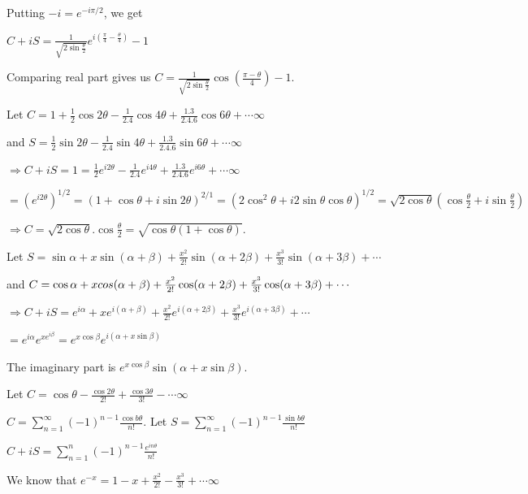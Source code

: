  Putting $-i = e^{-i\pi/2}$, we get

  $C + iS = \frac{1}{\sqrt{2\sin\frac{\theta}{2}}}e^{i\left(\frac{\pi}{4} - \frac{\theta}{4}\right)} - 1$

  Comparing real part gives us $C = \frac{1}{\sqrt{2\sin\frac{\theta}{2}}}\cos\left(\frac{\pi -
    \theta}{4}\right) - 1$.
\item Let $C = 1 + \frac{1}{2}\cos2\theta - \frac{1}{2.4}\cos4\theta + \frac{1.3}{2.4.6}\cos6\theta +
  \cdots \infty$

  and $S = \frac{1}{2}\sin2\theta - \frac{1}{2.4}\sin4\theta + \frac{1.3}{2.4.6}\sin6\theta +
  \cdots \infty$

  $\Rightarrow C + iS = 1 = \frac{1}{2}e^{i2\theta} - \frac{1}{2.4}e^{i4\theta} +
  \frac{1.3}{2.4.6}e^{i6\theta} + \cdots \infty$

  $= \left(e^{i2\theta}\right)^{1/2} = (1 + \cos\theta + i\sin2\theta)^{2/1} = \left(2\cos^2\theta +
  i2\sin\theta\cos\theta\right)^{1/2} = \sqrt{2\cos\theta}\left(\cos\frac{\theta}{2} +
  i\sin\frac{\theta}{2}\right)$

  $\Rightarrow C = \sqrt{2\cos\theta}.\cos\frac{\theta}{2} = \sqrt{\cos\theta(1 + \cos\theta)}$.
\item Let $S = \sin\alpha + x\sin(\alpha + \beta) + \frac{x^2}{2!}\sin(\alpha + 2\beta) +
  \frac{x^3}{3!}\sin(\alpha + 3\beta) + \cdots$

  and $C = \cos\alpha + x\\cos(\alpha + \beta) + \frac{x^2}{2!}\cos(\alpha + 2\beta) +
  \frac{x^3}{3!}\cos(\alpha + 3\beta) + \cdots$

  $\Rightarrow C + iS = e^{i\alpha} + xe^{i(\alpha + \beta)} + \frac{x^2}{2!}e^{i(\alpha + 2\beta)} +
  \frac{x^3}{3!}e^{i(\alpha + 3\beta)} + \cdots$

  $= e^{i\alpha}e^{xe}^{i\beta} = e^{x\cos\beta}e^{i(\alpha + x\sin\beta)}$

  The imaginary part is $e^{x\cos\beta}\sin(\alpha + x\sin\beta)$.
\item Let $C = \cos\theta - \frac{\cos2\theta}{2!} + \frac{\cos3\theta}{3!} - \cdots
  \infty$

  $C = \displaystyle\sum_{n = 1}^\infty(-1)^{n - 1}\frac{\cos b\theta}{n!}$. Let $S = \displaystyle\sum_{n =
    1}^\infty(-1)^{n - 1}\frac{\sin b\theta}{n!}$

  $C + iS = \displaystyle\sum_{n = 1}^n (-1)^{n - 1}\frac{e^{in\theta}}{n!}$

  We know that $e^{-x} = 1 - x + \frac{x^2}{2!} - \frac{x^3}{3!} + \cdots \infty$

